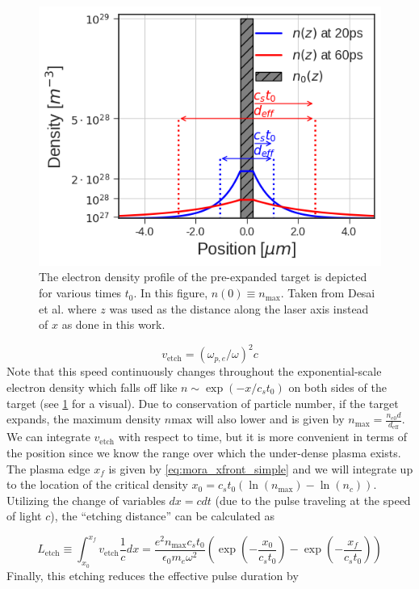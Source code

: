 \begin{figure}
	\centering 
	\includegraphics[width=0.6\linewidth]{planning/images/density_profile.png}
	\caption{The electron density profile of the pre-expanded target is depicted for various times $t_0$. In this figure, $n(0) \equiv n_\text{max}$. Taken from Desai et al.\cite{Desai_2024_arX} where $z$ was used as the distance along the laser axis instead of $x$ as done in this work. }
	\label{fig:density_profile}
\end{figure}
\begin{equation}
	v_\text{etch} = (\omega_{p,e}/\omega)^2 c \label{eq:vetch}
\end{equation}
Note that this speed continuously changes throughout the exponential-scale electron density which falls off like $n \sim \exp(-x/c_s t_0)$ on both sides of the target (see \cref{fig:density_profile} for a visual). Due to conservation of particle number, if the target expands, the maximum density $n\text{max}$ will also lower and is given by $n_\text{max} = \frac{n_{e0} d}{d_\text{eff}}$. We can integrate $v_\text{etch}$ with respect to time, but it is more convenient in terms of the position since we know the range over which the under-dense plasma exists. The plasma edge $x_f$ is given by \cref{eq:mora_xfront_simple} and we will integrate up to the location of the critical density $x_0 = c_s t_0 (\ln(n_\text{max}) - \ln(n_c))$. Utilizing the change of variables $dx = c dt$ (due to the pulse traveling at the speed of light $c$), the ``etching distance'' can be calculated as\cite{Desai_2024_arX} 

\begin{equation}
	L_\text{etch} \equiv \int_{x_0}^{x_f} v_\text{etch} \frac{1}{c} dx = \frac{e^2 n_\text{max} c_s t_0}{\epsilon_0 m_e \omega^2} \left( \exp{\left(-\frac{x_0}{c_s t_0}\right)} - \exp{\left(-\frac{x_f}{c_s t_0}\right)} \right)
\end{equation}
Finally, this etching reduces the effective pulse duration by 

